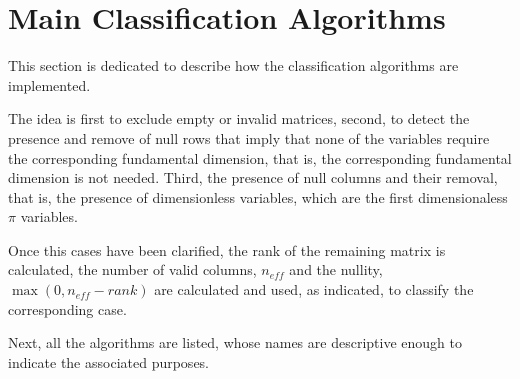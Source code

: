 \documentclass[
	11pt, %
	fleqn, %
	a4paper, %
]{LegrandOrangeBook}
\begin{document}




\section{Main Classification Algorithms}
This section is dedicated to describe how the classification algorithms are implemented.

The idea is first to exclude empty or invalid matrices, second, to detect the presence and remove of null rows that imply that none of the variables require the corresponding fundamental dimension, that is, the corresponding fundamental dimension is not needed. Third, the presence of null columns and their removal, that is, the presence of dimensionless variables, which are the first dimensionaless $\pi$ variables.

Once this cases have been clarified, the rank of the remaining matrix is calculated, the number of valid columns, $n_{eff}$ and the nullity, $\max(0, n_{eff} - rank)$ are calculated and used, as indicated, to classify the corresponding case.

Next, all the algorithms are listed, whose names are descriptive enough to indicate the associated purposes.
\end{document}
